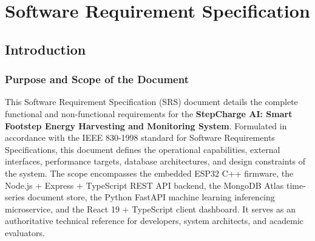 \chapter{Software Requirement Specification}

\section{Introduction}

\subsection{Purpose and Scope of the Document}
This Software Requirement Specification (SRS) document details the complete functional and non-functional requirements for the \textbf{StepCharge AI: Smart Footstep Energy Harvesting and Monitoring System}. Formulated in accordance with the IEEE 830-1998 standard for Software Requirements Specifications, this document defines the operational capabilities, external interfaces, performance targets, database architectures, and design constraints of the system. The scope encompasses the embedded ESP32 C++ firmware, the Node.js + Express + TypeScript REST API backend, the MongoDB Atlas time-series document store, the Python FastAPI machine learning inferencing microservice, and the React 19 + TypeScript client dashboard. It serves as an authoritative technical reference for developers, system architects, and academic evaluators.

